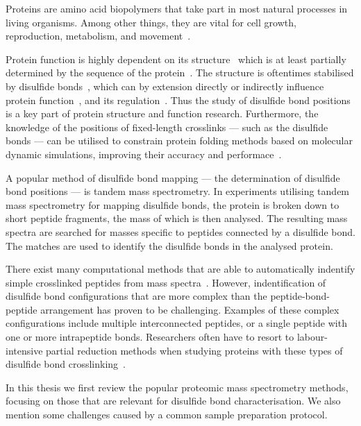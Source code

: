 
Proteins are amino acid biopolymers that take part in most natural processes in living organisms. Among other things, they are vital for cell growth, reproduction, metabolism, and movement~\cite{johnson1994sequential, prescott1968regulation, ketelaar2004actin, elston1998energy}.

Protein function is highly dependent on its structure~\cite{orengo1999protein} which is at least partially determined by the sequence of the protein~\cite{anfinsen1973principles}. The structure is oftentimes stabilised by disulfide bonds~\cite{wedemeyer2000disulfide, mcauley2008contributions}, which can by extension directly or indirectly influence protein function~\cite{nagahara2011intermolecular}, and its regulation~\cite{chiu2019allosteric}. Thus the study of disulfide bond positions is a key part of protein structure and function research. Furthermore, the knowledge of the positions of fixed-length crosslinks --- such as the disulfide bonds --- can be utilised to constrain protein folding methods based on molecular dynamic simulations, improving their accuracy and performace~\cite{brodie2017solving}.

A popular method of disulfide bond mapping --- the determination of disulfide bond positions --- is tandem mass spectrometry. In experiments utilising tandem mass spectrometry for mapping disulfide bonds, the protein is broken down to short peptide fragments, the mass of which is then analysed. The resulting mass spectra are searched for masses specific to peptides connected by a disulfide bond. The matches are used to identify the disulfide bonds in the analysed protein.

There exist many computational methods that are able to automatically indentify simple crosslinked peptides from mass spectra~\cite{lakbub2018recent, liu2014facilitating}. However, indentification of disulfide bond configurations that are more complex than the peptide-bond-peptide arrangement has proven to be challenging. Examples of these complex configurations include multiple interconnected peptides, or a single peptide with one or more intrapeptide bonds. Researchers often have to resort to labour-intensive partial reduction methods when studying proteins with these types of disulfide bond crosslinking~\cite{wu1997novel, li2013disulfide}.

In this thesis we first review the popular proteomic mass spectrometry methods, focusing on those that are relevant for disulfide bond characterisation. We also mention some challenges caused by a common sample preparation protocol.

